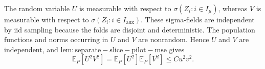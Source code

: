 The random variable \(U\) is measurable with respect to \(\sigma(Z_i:i\in I_\mu)\), whereas \(V\) is measurable with respect to \(\sigma(Z_i:i\in I_{\mathrm{aux}})\).  These sigma-fields are independent by iid sampling because the folds are disjoint and deterministic.  The population functions and norms occurring in \(U\) and \(V\) are nonrandom.  Hence \(U\) and \(V\) are independent, and \(\mathrm{lem:separate-slice-pilot-mse}\) gives
\[
\mathbb E_P[U^2V^2]=\mathbb E_P[U^2]\mathbb E_P[V^2]\le Cu^2v^2.
\]